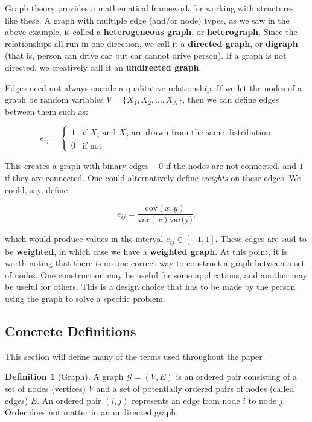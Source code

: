 \documentclass[12pt]{article}
\theoremstyle{definition}
\newtheorem{definition}{Definition}[section]
\begin{document}
Graph theory provides a mathematical framework for working with structures like these. A graph with multiple edge (and/or node) types, as we saw in the above example, is called a \textbf{heterogeneous graph}, or \textbf{heterograph}. Since the relationships all run in one direction, we call it a \textbf{directed graph}, or \textbf{digraph} (that is, person can drive car but car cannot drive person). If a graph is not directed, we creatively call it an \textbf{undirected graph}.

Edges need not always encode a qualitative relationship. If we let the nodes of a graph be random variables $V = \{X_1, X_2, ..., X_N\}$, then we can define edges between them such as:

\[
e_{ij} = \begin{cases}
1 & \text{if }X_i \text{ and } X_j \text{ are drawn from the same distribution} \\ 
0 & \text{if not}
\end{cases}
\]

This creates a graph with binary edges -- $0$ if the nodes are not connected, and $1$ if they are connected. One could alternatively define \textit{weights} on these edges. We could, say, define

\[
e_{ij} = \frac{\text{cov}(x,y)}{\text{var}(x) \text{var(y)}},
\]

which would produce values in the interval $e_{ij} \in [-1, 1]$. These edges are said to be \textbf{weighted}, in which case we have a \textbf{weighted graph}. At this point, it is worth noting that there is no one correct way to construct a graph between a set of nodes. One construction may be useful for some applications, and another may be useful for others. This is a design choice that has to be made by the person using the graph to solve a specific problem.

\subsection{Concrete Definitions}
\label{sec:definitions}

This section will define many of the terms used throughout the paper

\begin{definition}[Graph]
A graph $\mathcal{G} = (V, E)$ is an ordered pair consisting of a set of nodes (vertices) $V$ and a set of potentially ordered pairs of nodes (called edges) $E$. An ordered pair $(i, j)$ represents an edge from node $i$ to node $j$. Order does not matter in an undirected graph.
\end{definition}
\end{document}
